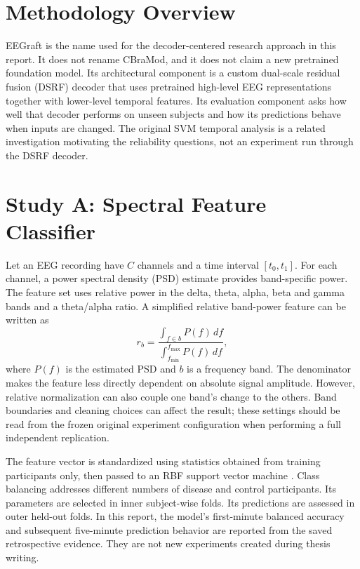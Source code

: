 \section{Methodology Overview}
EEGraft is the name used for the decoder-centered research approach in this report. It does not rename CBraMod, and it does not claim a new pretrained foundation model. Its architectural component is a custom dual-scale residual fusion (DSRF) decoder that uses pretrained high-level EEG representations together with lower-level temporal features. Its evaluation component asks how well that decoder performs on unseen subjects and how its predictions behave when inputs are changed. The original SVM temporal analysis is a related investigation motivating the reliability questions, not an experiment run through the DSRF decoder.

\section{Study A: Spectral Feature Classifier}
Let an EEG recording have $C$ channels and a time interval $[t_0,t_1]$. For each channel, a power spectral density (PSD) estimate provides band-specific power. The feature set uses relative power in the delta, theta, alpha, beta and gamma bands and a theta/alpha ratio. A simplified relative band-power feature can be written as
\begin{equation}
 r_b=\frac{\int_{f\in b} P(f)\,df}{\int_{f_{\min}}^{f_{\max}}P(f)\,df},
 \label{eq:relpower}
\end{equation}
where $P(f)$ is the estimated PSD and $b$ is a frequency band. The denominator makes the feature less directly dependent on absolute signal amplitude. However, relative normalization can also couple one band's change to the others. Band boundaries and cleaning choices can affect the result; these settings should be read from the frozen original experiment configuration when performing a full independent replication.

The feature vector is standardized using statistics obtained from training participants only, then passed to an RBF support vector machine \cite{cortes1995}. Class balancing addresses different numbers of disease and control participants. Its parameters are selected in inner subject-wise folds. Its predictions are assessed in outer held-out folds. In this report, the model's first-minute balanced accuracy and subsequent five-minute prediction behavior are reported from the saved retrospective evidence. They are not new experiments created during thesis writing.

